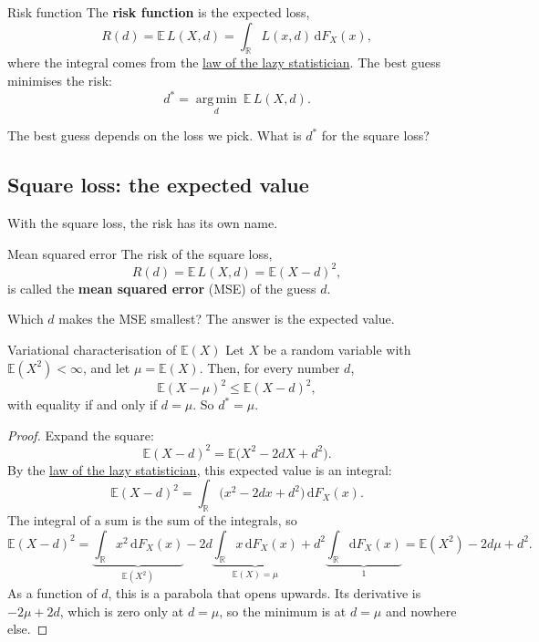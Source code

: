 \documentclass[a4paper,12pt,oneside]{report}
\begin{document}
\begin{frameddefn}{Risk function}\label{def:risk}
The \textbf{risk function} is the expected loss,
\[
R(d)=\mathbb{E}\,L(X,d)=\int_{\mathbb{R}}L(x,d)\,\mathrm{d}F_X(x),
\]
where the integral comes from the
\hyperref[sec:lazy]{law of the lazy statistician}. The best guess
minimises the risk:
\[
d^*=\operatorname*{arg\,min}_{d}\ \mathbb{E}\,L(X,d).
\]
\end{frameddefn}

The best guess depends on the loss we pick. What is $d^*$ for the square
loss?

\subsection{Square loss: the expected value}\label{sec:mse}

With the square loss, the risk has its own name.

\begin{frameddefn}{Mean squared error}\label{def:mse}
The risk of the square loss,
\[
R(d)=\mathbb{E}\,L(X,d)=\mathbb{E}(X-d)^2,
\]
is called the \textbf{mean squared error} (MSE) of the guess $d$.
\end{frameddefn}

Which $d$ makes the MSE smallest? The answer is the expected value.

\begin{framedprop}{Variational characterisation of $\mathbb{E}(X)$}\label{prop:mse}
Let $X$ be a random variable with $\mathbb{E}(X^2)<\infty$, and let
$\mu=\mathbb{E}(X)$. Then, for every number $d$,
\[
\mathbb{E}(X-\mu)^2\le\mathbb{E}(X-d)^2,
\]
with equality if and only if $d=\mu$. So $d^*=\mu$.
\end{framedprop}

\begin{proof}
Expand the square:
\[
\mathbb{E}(X-d)^2=\mathbb{E}\big(X^2-2dX+d^2\big).
\]
By the \hyperref[sec:lazy]{law of the lazy statistician}, this expected
value is an integral:
\[
\mathbb{E}(X-d)^2=\int_{\mathbb{R}}\big(x^2-2dx+d^2\big)\,\mathrm{d}F_X(x).
\]
The integral of a sum is the sum of the integrals, so
\[
\mathbb{E}(X-d)^2
=\underbrace{\int_{\mathbb{R}}x^2\,\mathrm{d}F_X(x)}_{\mathbb{E}(X^2)}
-2d\underbrace{\int_{\mathbb{R}}x\,\mathrm{d}F_X(x)}_{\mathbb{E}(X)=\mu}
+d^2\underbrace{\int_{\mathbb{R}}\mathrm{d}F_X(x)}_{1}
=\mathbb{E}(X^2)-2d\mu+d^2 .
\]
As a function of $d$, this is a parabola that opens upwards. Its
derivative is $-2\mu+2d$, which is zero only at $d=\mu$, so the minimum is
at $d=\mu$ and nowhere else.
\end{proof}
\end{document}
